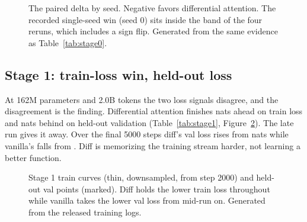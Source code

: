 \documentclass[11pt]{article}
\begin{document}
\begin{table}[tbp]
\centering

\caption{Stage 0 (30M params, 100M tokens) paired val loss by seed.
Seed 0 is the original run on the first data build, recorded before the
band was run. Seeds 1 to 4 rerun the full paired experiment on a
rebuilt tokenization of the same corpus. Generated from committed run
logs.}
\label{tab:stage0}
\end{table}

\begin{figure}[tbp]
\centering

\caption{The paired delta by seed. Negative favors differential
attention. The recorded single-seed win (seed 0) sits inside the band
of the four reruns, which includes a sign flip. Generated from the same
evidence as Table~\ref{tab:stage0}.}
\label{fig:band}
\end{figure}

\subsection{Stage 1: train-loss win, held-out loss}
At 162M parameters and 2.0B tokens the two loss signals disagree, and
the disagreement is the finding. Differential attention finishes
\StageOneTrainDeltaSigned{} nats ahead on train loss and
\StageOneValDeltaSigned{} nats behind on held-out validation
(Table~\ref{tab:stage1}, Figure~\ref{fig:curves}). The late run gives
it away. Over the final 5000 steps diff's val loss rises from
\StageOneDiffValLateRise{} nats while vanilla's falls from
\StageOneVanillaValLateFall{}. Diff is memorizing the training stream
harder, not learning a better function.

\begin{table}[tbp]
\centering

\caption{Stage 1 (162M params, 2.0B tokens) endpoints, seed 0, paired
init, identical data order. Positive $\delta$ favors vanilla. Generated
from the released training logs.}
\label{tab:stage1}
\end{table}

\begin{figure}[tbp]
\centering

\caption{Stage 1 train curves (thin, downsampled, from step 2000) and
held-out val points (marked). Diff holds the lower train loss
throughout while vanilla takes the lower val loss from mid-run on.
Generated from the released training logs.}
\label{fig:curves}
\end{figure}
\end{document}
